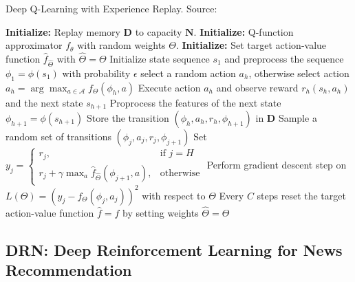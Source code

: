 \documentclass{mldsmsc}
\begin{document}
\begin{algorithm}
    \caption{Deep Q-Learning with Experience Replay. Source: \citep{RefWorks:mnih2015human-level}}
    \label{alg:deep-q-learning}
    \begin{algorithmic}[1]
        \State \textbf{Initialize:} Replay memory $\mathbf{D}$ to capacity $\mathbf{N}$.
        \State \textbf{Initialize:} Q-function approximator $f_{\theta}$ with random weights $\Theta$.
        \State \textbf{Initialize:} Set target action-value function $\hat{f}_{\hat{\Theta}}$ with $\hat{\Theta} = \Theta$
            \State Initialize state sequence $s_1$ and preprocess the sequence $\phi_1 = \phi(s_1)$
                \State with probability $\epsilon$ select a random action $a_h$,
                otherwise select action $a_h = \arg\max_{a \in \mathcal{A}} f_{\Theta}(\phi_h, a)$
                \State Execute action $a_h$ and observe reward $r_h(s_h, a_h)$ and the next state $s_{h+1}$
                \State Proprocess the features of the next state $\phi_{h+1} = \phi(s_{h+1})$
                \State Store the transition $(\phi_{h}, a_h, r_h, \phi_{h+1})$ in $\mathbf{D}$
                \State Sample a random set of transitions $(\phi_{j}, a_j, r_j, \phi_{j+1})$
                \State Set $y_j = \begin{cases} r_j, & \text{if } j=H\\ r_j + \gamma \max_{a} \hat{f}_{\hat{\Theta}}(\phi_{j+1},a), & \text{otherwise} \end{cases}$
                \State Perform gradient descent step on $L(\Theta) = \left(y_j - f_{\Theta}(\phi_j,a_j)\right)^2$ with respect to $\Theta$
                \State Every $C$ steps reset the target action-value function $\hat{f} = f$ by setting weights $\hat{\Theta} = \Theta$
            \EndFor
        \EndFor
    \end{algorithmic}
\end{algorithm}

\subsection{DRN: Deep Reinforcement Learning for News Recommendation}
\end{document}
